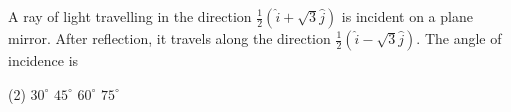 
\item A ray of light travelling in the direction $\frac{1}{2}( \hat{i} + \sqrt{3}\hat{j})$ is incident on a plane mirror. After reflection, it travels along the direction $\frac{1}{2}( \hat{i} - \sqrt{3}\hat{j})$. The angle of incidence is
    \begin{tasks}(2)
        \task $30^\circ$
        \task $45^\circ$
        \task $60^\circ$\ans
        \task $75^\circ$
    \end{tasks}
